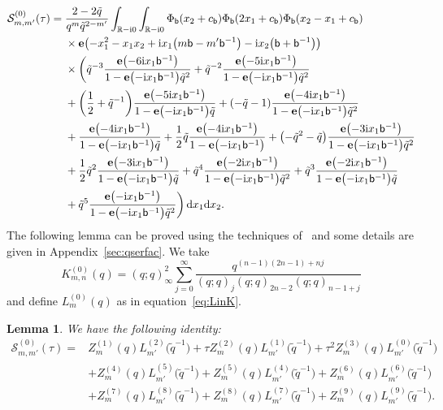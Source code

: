 \documentclass[pdftex]{sigma}
\numberwithin{equation}{section}
\newtheorem{Lemma}[Theorem]{Lemma}
\def\BR{\mathbb{R}}
\def\tq{\tilde{q}}
\def\e{\mathbf e}
\def\BR{\mathbb R}
\def\calS{\mathcal S}
\def\tq{\tilde{q}}
\begin{document}
\begin{align}
 \calS^{(0)}_{m,m'}(\tau) ={}&\frac{2-2\tq}{q^{m}\tq^{2-m'}}\int_{\BR-{\rm i}0}\int_{\BR-{\rm i}0}\Phi_{\mathsf{b}}(x_2+c_{\mathsf{b}}) \Phi_{\mathsf{b}}(2x_1+c_{\mathsf{b}})\Phi_{\mathsf{b}}(x_2-x_1+c_{\mathsf{b}})\nonumber\\
 & \times\e\bigl(-x_1^2-x_1x_2+{\rm i}x_1\bigl(m\mathsf{b}-m'\mathsf{b}^{-1}\bigr)-{\rm i}x_2\bigl(\mathsf{b}+\mathsf{b}^{-1}\bigr)\bigr)\nonumber\\
 &\times\biggl(\tq^{-3}\frac{\e\bigl(-6{\rm i}x_1\mathsf{b}^{-1}\bigr)}{1-\e\bigl(-{\rm i}x_1\mathsf{b}^{-1}\bigr)\tq^{2}}
 +\tq^{-2}\frac{\e\bigl(-5{\rm i}x_1\mathsf{b}^{-1}\bigr)}{1-\e\bigl(-{\rm i}x_1\mathsf{b}^{-1}\bigr)\tq^{2}} \nonumber\\
& + \biggl(\frac{1}{2} + \tq^{-1}\biggr)\frac{\e\bigl(-5{\rm i}x_1\mathsf{b}^{-1}\bigr)}{1-\e\bigl(-{\rm i}x_1\mathsf{b}^{-1}\bigr)\tq}
  +(-\tq - 1)\frac{\e\bigl(-4{\rm i}x_1\mathsf{b}^{-1}\bigr)}{1-\e\bigl(-{\rm i}x_1\mathsf{b}^{-1}\bigr)\tq^{2}}\nonumber\\
   & + \frac{\e\bigl(-4{\rm i}x_1\mathsf{b}^{-1}\bigr)}{1-\e\bigl(-{\rm i}x_1\mathsf{b}^{-1}\bigr)\tq} + \frac{1}{2}\tq \frac{\e\bigl(-4{\rm i}x_1\mathsf{b}^{-1}\bigr)}{1-\e\bigl(-{\rm i}x_1\mathsf{b}^{-1}\bigr)}
  +\bigl(-\tq^2 - \tq\bigr)\frac{\e\bigl(-3{\rm i}x_1\mathsf{b}^{-1}\bigr)}{1-\e\bigl(-{\rm i}x_1\mathsf{b}^{-1}\bigr)\tq^{2}} \nonumber\\
  & + \frac{1}{2}\tq^2\frac{\e\bigl(-3{\rm i}x_1\mathsf{b}^{-1}\bigr)}{1-\e\bigl(-{\rm i}x_1\mathsf{b}^{-1}\bigr)\tq}
  +\tq^4\frac{\e\bigl(-2{\rm i}x_1\mathsf{b}^{-1}\bigr)}{1-\e\bigl(-{\rm i}x_1\mathsf{b}^{-1}\bigr)\tq^{2}} + \tq^3\frac{\e\bigl(-2{\rm i}x_1\mathsf{b}^{-1}\bigr)}{1-\e\bigl(-{\rm i}x_1\mathsf{b}^{-1}\bigr)\tq}\nonumber\\
  &
 +\tq^5\frac{\e\bigl(-{\rm i}x_1\mathsf{b}^{-1}\bigr)}{1-\e\bigl(-{\rm i}x_1\mathsf{b}^{-1}\bigr)\tq^{2}}\biggr)\,{\rm d}x_1{\rm d}x_2 .\label{eq:inhom.statint}
\end{align}
The following lemma can be proved using the techniques of~\cite{GK:qser} and some details are given in Appendix~\ref{sec:qserfac}. We take
\[
 K^{(0)}_{m,n}(q) =(q;q)_{\infty}^2\sum_{j=0}^{\infty}\frac{q^{(n-1)(2n-1)+nj}}{(q;q)_{j}(q;q)_{2n-2}(q;q)_{n-1+j}}
\]
and define $L^{(0)}_{m}(q)$ as in equation~\eqref{eq:LinK}.
\begin{Lemma}\label{lem:8x8stateint}
 We have the following identity:
 \begin{align*}
\calS^{(0)}_{m,m'}(\tau)
  ={}&
 Z_{m}^{(1)}(q)L_{m'}^{(2)}\bigl(\tq^{-1}\bigr)+\tau Z_{m}^{(2)}(q)L_{m'}^{(1)}\bigl(\tq^{-1}\bigr)+\tau^2 Z_{m}^{(3)}(q)L_{m'}^{(0)}\bigl(\tq^{-1}\bigr)\\
 &+Z_{m}^{(4)}(q)L_{m'}^{(5)}\bigl(\tq^{-1}\bigr)+Z_{m}^{(5)}(q)L_{m'}^{(4)}\bigl(\tq^{-1}\bigr)+Z_{m}^{(6)}(q)L_{m'}^{(6)}\bigl(\tq^{-1}\bigr)
\\
 & +Z_{m}^{(7)}(q)L_{m'}^{(8)}\bigl(\tq^{-1}\bigr) +Z_{m}^{(8)}(q)L_{m'}^{(7)}\bigl(\tq^{-1}\bigr)+Z_{m}^{(9)}(q)L_{m'}^{(9)}\bigl(\tq^{-1}\bigr) .
 \end{align*}
\end{Lemma}
\end{document}

